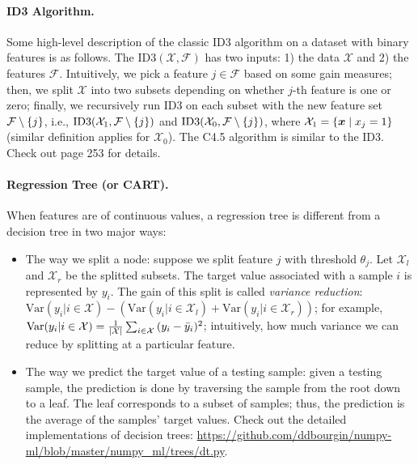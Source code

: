     \paragraph{ID3 Algorithm.} Some high-level description of the classic ID3 algorithm on a dataset with binary features is as follows.
    The $\text{ID3}(\mathcal{X}, \mathcal{F})$ has two inputs: 1) the data $\mathcal{X}$ and 2) the features $\mathcal{F}$.
    Intuitively, we pick a feature $j \in \mathcal{F}$ based on some gain measures; then, we split $\mathcal{X}$ into two subsets depending on whether $j$-th feature is one or zero; finally, we recursively run ID3 on each subset  with the new feature set $\mathcal{F} \setminus \{ j \}$, i.e., $\text{ID3}(\mathcal{X}_1, \mathcal{F} \setminus \{ j \})$ and $\text{ID3}(\mathcal{X}_0, \mathcal{F} \setminus \{ j \})$, where $\mathcal{X}_1 = \{ \bm{x} \mid x_j = 1 \}$ (similar definition applies for $\mathcal{X}_0$).
    The C4.5 algorithm is similar to the ID3. 
    Check out \cite{shalev2014understanding} page 253 for details. 

    \paragraph{Regression Tree (or CART).} 
    When features are of continuous values, a regression tree is different from a decision tree in two major ways:
        \begin{itemize}
            \item The way we split a node: suppose we split feature $j$ with threshold $\theta_j$.
            Let $\mathcal{X}_l$ and $\mathcal{X}_r$ be the splitted subsets. 
            The target value associated with a sample $i$ is represented by $y_i$.
            The gain of this split is called \emph{variance reduction}:
            $\text{Var}(y_i | i \in \mathcal{X}) - (\text{Var}(y_i | i \in \mathcal{X}_l) + \text{Var}(y_i | i \in \mathcal{X}_r))$; for example, $\text{Var}(y_i | i \in \mathcal{X}) = \frac{1}{| \mathcal{X} |}\sum_{i \in \mathcal{X}}^{}{(y_i - \bar{y}_i)^2}$; intuitively, how much variance we can reduce by splitting at a particular feature.
            \item The way we predict the target value of a testing sample: given a testing sample, the prediction is done by traversing the sample from the root down to a leaf.
            The leaf corresponds to a subset of samples; thus, the prediction is the average of the samples' target values.
            Check out the detailed implementations of decision trees: \url{https://github.com/ddbourgin/numpy-ml/blob/master/numpy_ml/trees/dt.py}.
        \end{itemize}
    

